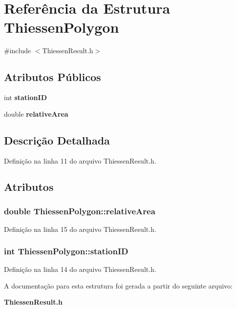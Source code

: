 \section{Referência da Estrutura Thiessen\+Polygon}
\label{struct_thiessen_polygon}


{\ttfamily \#include $<$Thiessen\+Result.\+h$>$}

\subsection*{Atributos Públicos}
\begin{DoxyCompactItemize}
\item 
int {\bf station\+ID}
\item 
double {\bf relative\+Area}
\end{DoxyCompactItemize}


\subsection{Descrição Detalhada}


Definição na linha 11 do arquivo Thiessen\+Result.\+h.



\subsection{Atributos}
\subsubsection[{relative\+Area}]{\setlength{\rightskip}{0pt plus 5cm}double Thiessen\+Polygon\+::relative\+Area}\label{struct_thiessen_polygon_a0f4563cb5bb756ca64e8e321ddde5332}


Definição na linha 15 do arquivo Thiessen\+Result.\+h.

\subsubsection[{station\+ID}]{\setlength{\rightskip}{0pt plus 5cm}int Thiessen\+Polygon\+::station\+ID}\label{struct_thiessen_polygon_ae6587b018b71298818c672d2bf2bba0e}


Definição na linha 14 do arquivo Thiessen\+Result.\+h.



A documentação para esta estrutura foi gerada a partir do seguinte arquivo\+:\begin{DoxyCompactItemize}
\item 
{\bf Thiessen\+Result.\+h}\end{DoxyCompactItemize}
